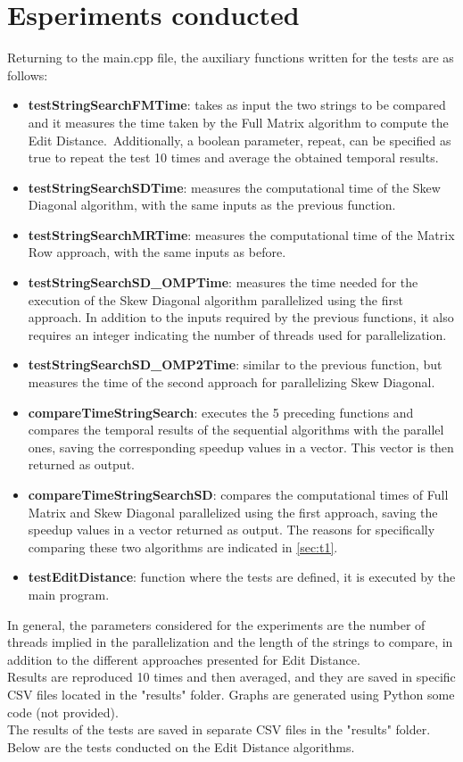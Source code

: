 \documentclass[10pt,twocolumn,letterpaper]{article}
\newcommand{\bit} {\begin{itemize} }
\newcommand{\eit} {\end{itemize} }
\begin{document}
\section{Esperiments conducted}
\label{sec:exp}
Returning to the main.cpp file, the auxiliary functions written for the tests are as follows:

\bit
    \item{\textbf{testStringSearchFMTime}: takes as input the two strings to be compared and it measures the time taken by the Full Matrix algorithm to compute the Edit Distance.\ Additionally, a boolean parameter, repeat, can be specified as true to repeat the test 10 times and average the obtained temporal results.}
    \item{\textbf{testStringSearchSDTime}: measures the computational time of the Skew Diagonal algorithm, with the same inputs as the previous function.}
    \item{\textbf{testStringSearchMRTime}: measures the computational time of the Matrix Row approach, with the same inputs as before.}
    \item{\textbf{testStringSearchSD\_OMPTime}: measures the time needed for the execution of the Skew Diagonal algorithm parallelized using the first approach. In addition to the inputs required by the previous functions, it also requires an integer indicating the number of threads used for parallelization.}
    \item{\textbf{testStringSearchSD\_OMP2Time}: similar to the previous function, but measures the time of the second approach for parallelizing Skew Diagonal.}
    \item{\textbf{compareTimeStringSearch}: executes the 5 preceding functions and compares the temporal results of the sequential algorithms with the parallel ones, saving the corresponding speedup values in a vector. This vector is then returned as output.}
    \item{\textbf{compareTimeStringSearchSD}: compares the computational times of Full Matrix and Skew Diagonal parallelized using the first approach, saving the speedup values in a vector returned as output. The reasons for specifically comparing these two algorithms are indicated in \cref{sec:t1}.}
    \item{\textbf{testEditDistance}: function where the tests are defined, it is executed by the main program.}
\eit

In general, the parameters considered for the experiments are the number of threads implied in the parallelization and the length of the strings to compare, in addition to the different approaches presented for Edit Distance.\\
Results are reproduced 10 times and then averaged, and they are saved in specific CSV files located in the "results" folder. Graphs are generated using Python some code (not provided).\\
The results of the tests are saved in separate CSV files in the "results" folder.\\ Below are the tests conducted on the Edit Distance algorithms.
\end{document}
